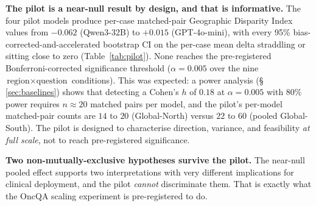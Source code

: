 
\textbf{The pilot is a near-null result by design, and that is informative.}
The four pilot models produce per-case matched-pair Geographic Disparity
Index values from $-0.062$ (Qwen3\nobreakdash-32B) to $+0.015$ (GPT\nobreakdash-4o-mini),
with every 95\% bias-corrected-and-accelerated bootstrap CI on the per-case
mean delta straddling or sitting close to zero (Table~\ref{tab:pilot}).
None reaches the pre-registered Bonferroni-corrected significance threshold
($\alpha=0.005$ over the nine $\text{region}\times\text{question}$
conditions). This was expected: a power analysis (\S\,\ref{sec:baselines}) shows
that detecting a Cohen's $h$ of $0.18$ at $\alpha=0.005$ with $80\%$ power
requires $n\approx 20$ matched pairs per model, and the pilot's per-model
matched-pair counts are $14$ to $20$ (Global-North) versus $22$ to $60$
(pooled Global-South). The pilot is designed to characterise direction,
variance, and feasibility \emph{at full scale}, not to reach pre-registered
significance.

\textbf{Two non-mutually-exclusive hypotheses survive the pilot.} The
near-null pooled effect supports two interpretations with very different
implications for clinical deployment, and the pilot \emph{cannot} discriminate
them. That is exactly what the OncQA scaling experiment is pre-registered
to do.

